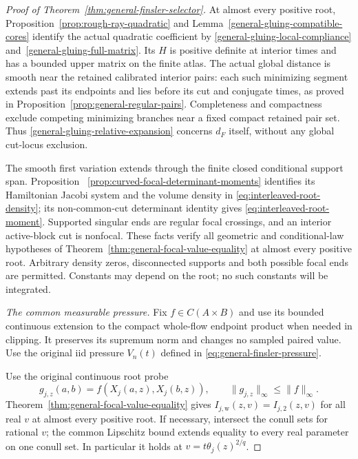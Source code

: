 \documentclass[11pt,reqno]{amsart}
\theoremstyle{definition}
\theoremstyle{remark}
\numberwithin{equation}{section}
\begin{document}
\begin{proof}[Proof of Theorem~\ref{thm:general-finsler-selector}]
At almost every positive root,
Proposition~\ref{prop:rough-ray-quadratic} and
Lemma~\ref{general-gluing-compatible-cores} identify the actual
quadratic coefficient by \eqref{general-gluing-local-compliance}
and~\eqref{general-gluing-full-matrix}. Its \(H\) is positive
definite at interior times and has a bounded upper matrix on the
finite atlas. The actual global distance is smooth near the
retained calibrated interior pairs: each such minimizing segment
extends past its endpoints and lies before its cut and conjugate
times, as proved in Proposition~\ref{prop:general-regular-pairs}.
Completeness and compactness exclude competing minimizing branches
near a fixed compact retained pair set.
Thus \eqref{general-gluing-relative-expansion} concerns \(d_F\)
itself, without any global cut-locus exclusion.

The smooth first variation extends through the finite closed
conditional support span. Proposition~
\ref{prop:curved-focal-determinant-moments} identifies its Hamiltonian
Jacobi system and the volume density in
\eqref{eq:interleaved-root-density}; its non-common-cut determinant
identity gives \eqref{eq:interleaved-root-moment}. Supported singular
ends are regular focal crossings, and an interior active-block cut
is nonfocal. These facts verify all geometric and conditional-law
hypotheses of Theorem~\ref{thm:general-focal-value-equality}
at almost every positive root. Arbitrary density zeros, disconnected
supports and both possible focal ends are permitted. Constants may
depend on the root; no such constants will be integrated.

\emph{The common measurable pressure.}
Fix \(f\in C(A\times B)\) and use its bounded continuous extension
to the compact whole-flow endpoint product when needed in clipping.
It preserves its supremum norm and changes no sampled paired value.
Use the original iid pressure \(V_n(t)\) defined in
\eqref{eq:general-finsler-pressure}.

Use the original continuous root probe
\[
 g_{j,z}(a,b)=f(X_j(a,z),X_j(b,z)),\qquad
                         \|g_{j,z}\|_\infty\le\|f\|_\infty.
\]
Theorem~\ref{thm:general-focal-value-equality} gives
\(I_{j,\mathrm w}(z,v)=I_{j,2}(z,v)\) for all real \(v\) at
almost every positive root. If necessary, intersect the conull
sets for rational \(v\); the common Lipschitz bound extends equality
to every real parameter on one conull set. In particular it holds
at \(v=t\theta_j(z)^{2/q}\).


\end{proof}
\end{document}
